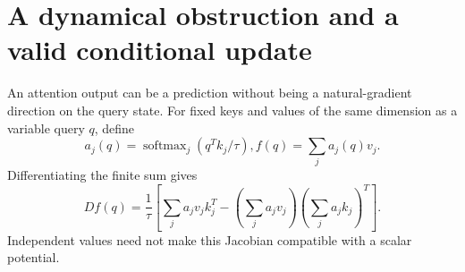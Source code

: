 \documentclass[11pt]{article}
\newcommand{\softmax}{\operatorname{softmax}}
\begin{document}
\section{A dynamical obstruction and a valid conditional update}
\label{sec:gradient}
An attention output can be a prediction without being a natural-gradient direction on the query state. For fixed keys and values of the same dimension as a variable query $q$, define
\begin{equation}
a_j(q)=\softmax_j(q^Tk_j/\tau), f(q)=\sum_ja_j(q)v_j.
\end{equation}
Differentiating the finite sum gives
\begin{equation}
Df(q)=\frac1\tau\left[\sum_ja_jv_jk_j^T-
\left(\sum_ja_jv_j\right)\left(\sum_ja_jk_j\right)^T\right].
\label{eq:attention-jacobian}
\end{equation}
Independent values need not make this Jacobian compatible with a scalar potential.
\end{document}
